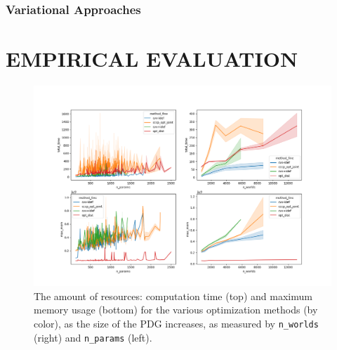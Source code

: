 \documentclass[twoside]{article}
\begin{document}
\subsubsection{Variational Approaches}




\section{EMPIRICAL EVALUATION} \label{sec:expts}

\begin{figure}
    \includegraphics[width=\linewidth]{figs/resources-fine}
    \caption{
        The amount of resources: computation time (top) and maximum memory usage (bottom) for the various optimization methods (by color), as the size of the PDG increases, as measured by \texttt{n\_worlds} (right) and \texttt{n\_params} (left).
     }\label{fig:resources}
\end{figure}
\end{document}
